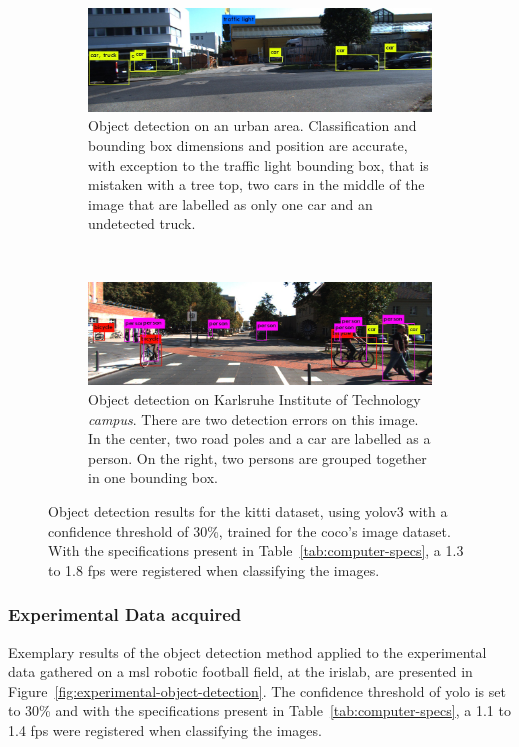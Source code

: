 \begin{figure}[ht!]
	\centering
	\begin{subfigure}[c]{0.8\textwidth}
		\includegraphics[width=\textwidth]{img/object-detection/kitti-4.jpg}
		\caption{Object detection on an urban area. Classification and bounding box dimensions and position are accurate, with exception to the traffic light bounding box, that is mistaken with a tree top, two cars in the middle of the image that are labelled as only one car and an undetected truck.}
		\label{fig:kitti-yolo-3}
	\end{subfigure}
	\\ \vspace{4mm}
	\begin{subfigure}[c]{0.8\textwidth}
		\includegraphics[width=\textwidth]{img/object-detection/kitti-2.jpg}
		\caption{Object detection on Karlsruhe Institute of Technology \textit{campus}. There are two detection errors on this image. In the center, two road poles and a car are labelled as a person. On the right, two persons are grouped together in one bounding box.}
		\label{fig:kitti-yolo-2}
	\end{subfigure}
	\caption[Image object detection results on \ac{kitti} dataset.]{Object detection results for the \ac{kitti} dataset, using \ac{yolo}v3 with a confidence threshold of 30\%, trained for the \ac{coco}'s image dataset. With the specifications present in Table~\ref{tab:computer-specs}, a 1.3 to 1.8 \ac{fps} were registered when classifying the images.}
	\label{fig:kitti-object-detection}
\end{figure}


\subsubsection{Experimental Data acquired}
Exemplary results of the object detection method applied to the experimental data gathered on a \ac{msl} robotic football field, at the \acf{irislab}, are presented in Figure~\ref{fig:experimental-object-detection}. The confidence threshold of \ac{yolo} is set to 30\% and with the specifications present in Table~\ref{tab:computer-specs}, a 1.1 to 1.4 \ac{fps} were registered when classifying the images.

